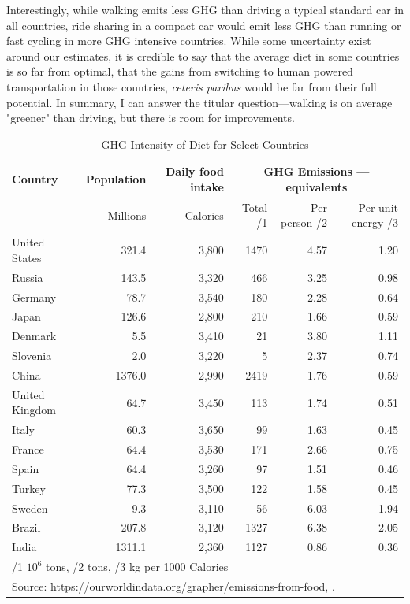 \documentclass{article}[12pt,letterpaper]
\begin{document}
Interestingly, while walking emits less GHG than driving a typical standard car in all countries, ride sharing in a compact car would emit less GHG than running or fast cycling in more GHG intensive countries. While some uncertainty exist around our estimates, it is credible to say that the average diet in some countries is so far from optimal, that the gains from switching to human powered transportation in those countries, {\em ceteris paribus} would be far from their full potential. In summary, I can answer the titular question---walking is on average "greener" than driving, but there is room for improvements.

\begin{table}[ht]
\begin{center}
\caption{GHG Intensity of Diet for Select Countries}
\label{tab:ghg-from-food}
\begin{tabular}{l|r|r|r|r|r}
\hline
Country	& Population &	Daily food intake & \multicolumn{3}{|c|}{GHG Emissions --- \cadi equivalents}\\
\hline
& Millions & Calories & Total /1 &  Per person /2 & Per unit energy /3 \\
\hline
United States	&	321.4	&	3,800	&	1470	&	4.57	&	1.20	\\
Russia	&	143.5	&	3,320	&	466	&	3.25	&	0.98	\\
Germany	&	78.7	&	3,540	&	180	&	2.28	&	0.64	\\
Japan	&	126.6	&	2,800	&	210	&	1.66	&	0.59	\\
Denmark	&	5.5	&	3,410	&	21	&	3.80	&	1.11	\\
Slovenia	&	2.0	&	3,220	&	5	&	2.37	&	0.74	\\
China	&	1376.0	&	2,990	&	2419	&	1.76	&	0.59	\\
United Kingdom	&	64.7	&	3,450	&	113	&	1.74	&	0.51	\\
Italy	&	60.3	&	3,650	&	99	&	1.63	&	0.45	\\
France	&	64.4	&	3,530	&	171	&	2.66	&	0.75	\\
Spain	&	64.4	&	3,260	&	97	&	1.51	&	0.46	\\
Turkey	&	77.3	&	3,500	&	122	&	1.58	&	0.45	\\
Sweden	&	9.3	&	3,110	&	56	&	6.03	&	1.94	\\
Brazil	&	207.8	&	3,120	&	1327	&	6.38	&	2.05	\\
India	&	1311.1	&	2,360	&	1127	&	0.86	&	0.36	\\
\hline
\multicolumn{6}{l}{/1 $10^6$ tons, /2 tons, /3 kg per 1000 Calories }\\
\hline
\multicolumn{6}{l}{Source: https://ourworldindata.org/grapher/emissions-from-food, \cite{owidenvironmentalimpactsoffood}.}\\
\end{tabular}
\end{center}
\end{table}
\end{document}

